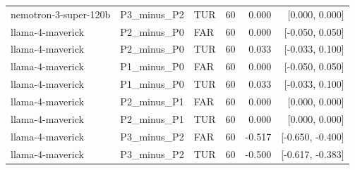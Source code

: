 \begin{tabular}{llllrr}
nemotron-3-super-120b & P3\_minus\_P2 & TUR & 60 & 0.000 & [0.000, 0.000] \\
llama-4-maverick & P2\_minus\_P0 & FAR & 60 & 0.000 & [-0.050, 0.050] \\
llama-4-maverick & P2\_minus\_P0 & TUR & 60 & 0.033 & [-0.033, 0.100] \\
llama-4-maverick & P1\_minus\_P0 & FAR & 60 & 0.000 & [-0.050, 0.050] \\
llama-4-maverick & P1\_minus\_P0 & TUR & 60 & 0.033 & [-0.033, 0.100] \\
llama-4-maverick & P2\_minus\_P1 & FAR & 60 & 0.000 & [0.000, 0.000] \\
llama-4-maverick & P2\_minus\_P1 & TUR & 60 & 0.000 & [0.000, 0.000] \\
llama-4-maverick & P3\_minus\_P2 & FAR & 60 & -0.517 & [-0.650, -0.400] \\
llama-4-maverick & P3\_minus\_P2 & TUR & 60 & -0.500 & [-0.617, -0.383] \\
\bottomrule
\end{tabular}
